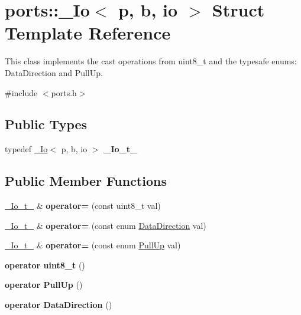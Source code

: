 \hypertarget{structports_1_1__Io}{}\section{ports\+:\+:\+\_\+\+Io$<$ p, b, io $>$ Struct Template Reference}
\label{structports_1_1__Io}


This class implements the cast operations from uint8\+\_\+t and the typesafe enums\+: Data\+Direction and Pull\+Up.  




{\ttfamily \#include $<$ports.\+h$>$}

\subsection*{Public Types}
\begin{DoxyCompactItemize}
\item 
\hypertarget{structports_1_1__Io_aa0e505ef1e6b227c9217b6e09bbc29dd}{}\label{structports_1_1__Io_aa0e505ef1e6b227c9217b6e09bbc29dd} 
typedef \hyperlink{structports_1_1__Io}{\+\_\+\+Io}$<$ p, b, io $>$ {\bfseries \+\_\+\+Io\+\_\+t\+\_\+}
\end{DoxyCompactItemize}
\subsection*{Public Member Functions}
\begin{DoxyCompactItemize}
\item 
\hypertarget{structports_1_1__Io_aa63b64d1b91b6b4aad47aed873fe3c32}{}\label{structports_1_1__Io_aa63b64d1b91b6b4aad47aed873fe3c32} 
\hyperlink{structports_1_1__Io}{\+\_\+\+Io\+\_\+t\+\_\+} \& {\bfseries operator=} (const uint8\+\_\+t val)
\item 
\hypertarget{structports_1_1__Io_ab145f95fb959830980100fbc45ac69af}{}\label{structports_1_1__Io_ab145f95fb959830980100fbc45ac69af} 
\hyperlink{structports_1_1__Io}{\+\_\+\+Io\+\_\+t\+\_\+} \& {\bfseries operator=} (const enum \hyperlink{namespaceports_a46987e78fa447129742fadda5eccafb4}{Data\+Direction} val)
\item 
\hypertarget{structports_1_1__Io_ae7f2ce69c05d6ea05eb199b12024ec97}{}\label{structports_1_1__Io_ae7f2ce69c05d6ea05eb199b12024ec97} 
\hyperlink{structports_1_1__Io}{\+\_\+\+Io\+\_\+t\+\_\+} \& {\bfseries operator=} (const enum \hyperlink{namespaceports_a49bf0ccedb4cfed89a328574e53bec07}{Pull\+Up} val)
\item 
\hypertarget{structports_1_1__Io_a0d29b542e05f091d192777422f3f533d}{}\label{structports_1_1__Io_a0d29b542e05f091d192777422f3f533d} 
{\bfseries operator uint8\+\_\+t} ()
\item 
\hypertarget{structports_1_1__Io_a2839cbabc2755394ea5c75f82fa01757}{}\label{structports_1_1__Io_a2839cbabc2755394ea5c75f82fa01757} 
{\bfseries operator Pull\+Up} ()
\item 
\hypertarget{structports_1_1__Io_a762e4da314442a065391daee5b738d25}{}\label{structports_1_1__Io_a762e4da314442a065391daee5b738d25} 
{\bfseries operator Data\+Direction} ()
\end{DoxyCompactItemize}
